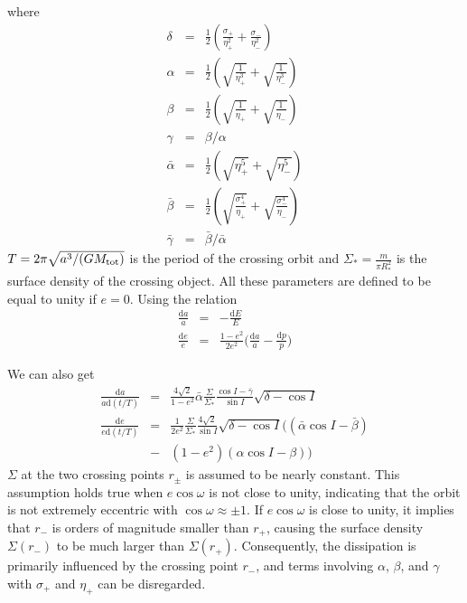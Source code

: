 \documentclass[fleqn,usenatbib]{mnras}
\newcommand{\dd}[0]{\mathrm{d}}
\begin{document}
where 
\begin{eqnarray}
{\delta}&=&\frac{1}{2}(\frac{\sigma_+}{\eta_+^2} + \frac{\sigma_-}{\eta_-^2} )\\
\alpha &=&  \frac{1}{2}(\sqrt{\frac{1}{\eta_+^3}} +\sqrt{\frac{1}{\eta_-^3}}) \\
\beta &=& \frac{1}{2}(\sqrt{\frac{1}{\eta_+}} + \sqrt{\frac{1}{\eta_-}}) \\
\gamma &=& \beta/\alpha\\
\bar{\alpha} &=&  \frac{1}{2}(\sqrt{\eta_+^5} +\sqrt{\eta_-^5}) \\
\bar{\beta} &=& \frac{1}{2}(\sqrt{\frac{\sigma_+^4}{\eta_+}} + \sqrt{\frac{\sigma_-^4}{\eta_-}}) \\
\bar{\gamma} &=& \bar{\beta}/\bar{\alpha}
\end{eqnarray}
$T=2\pi\sqrt{a^3/(GM_{\rm tot})}$ is the period of the crossing orbit and $\Sigma_*=\frac{m}{\pi R_*^2}$ is the surface density of the crossing object. All these parameters are defined to be equal to unity if $e=0$.  Using the relation
\begin{eqnarray}
\frac{\dd a}{a} &=& -\frac{\dd E}{E}\\
\frac{\dd e}{e} &=& \frac{1-e^2}{2e^2}\bigg(\frac{\dd a}{a}-\frac{\dd p}{p}\bigg)
\end{eqnarray}

We can also get
\begin{eqnarray}
\frac{\dd a}{a\dd(t/T)} &=& \frac{4\sqrt{2}}{1-e^2}\bar{\alpha}\frac{\Sigma}{\Sigma_*}\frac{\cos I-\bar{\gamma}}{\sin I}\sqrt{ \delta -\cos I} \label{eq:dadt}\\
\frac{\dd e}{e\dd(t/T)} &=& \frac{1}{2e^2}\frac{\Sigma}{\Sigma_*}\frac{4\sqrt{2}}{\sin I}\sqrt{ \delta -\cos I}\bigg((\bar{\alpha}\cos I - \bar{\beta})\nonumber\\
&-& (1-e^2)(\alpha\cos I - \beta)\bigg)\label{eq:dedt}
\end{eqnarray}
$\Sigma$ at the two crossing points $r_\pm$ is assumed to be nearly constant. This assumption holds true when $e\cos\omega$ is not close to unity, indicating that the orbit is not extremely eccentric with $\cos\omega \approx \pm 1$. If $e\cos\omega$ is close to unity, it implies that $r_-$ is orders of magnitude smaller than $r_+$, causing the surface density $\Sigma(r_-)$ to be much larger than $\Sigma(r_+)$. Consequently, the dissipation is primarily influenced by the crossing point $r_-$, and terms involving $\alpha$, $\beta$, and $\gamma$ with $\sigma_+$ and $\eta_+$ can be disregarded.
\end{document}
